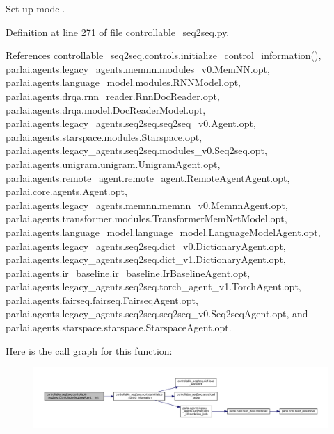 \begin{DoxyVerb}Set up model.\end{DoxyVerb}
 

Definition at line 271 of file controllable\+\_\+seq2seq.\+py.



References controllable\+\_\+seq2seq.\+controls.\+initialize\+\_\+control\+\_\+information(), parlai.\+agents.\+legacy\+\_\+agents.\+memnn.\+modules\+\_\+v0.\+Mem\+N\+N.\+opt, parlai.\+agents.\+language\+\_\+model.\+modules.\+R\+N\+N\+Model.\+opt, parlai.\+agents.\+drqa.\+rnn\+\_\+reader.\+Rnn\+Doc\+Reader.\+opt, parlai.\+agents.\+drqa.\+model.\+Doc\+Reader\+Model.\+opt, parlai.\+agents.\+legacy\+\_\+agents.\+seq2seq.\+seq2seq\+\_\+v0.\+Agent.\+opt, parlai.\+agents.\+starspace.\+modules.\+Starspace.\+opt, parlai.\+agents.\+legacy\+\_\+agents.\+seq2seq.\+modules\+\_\+v0.\+Seq2seq.\+opt, parlai.\+agents.\+unigram.\+unigram.\+Unigram\+Agent.\+opt, parlai.\+agents.\+remote\+\_\+agent.\+remote\+\_\+agent.\+Remote\+Agent\+Agent.\+opt, parlai.\+core.\+agents.\+Agent.\+opt, parlai.\+agents.\+legacy\+\_\+agents.\+memnn.\+memnn\+\_\+v0.\+Memnn\+Agent.\+opt, parlai.\+agents.\+transformer.\+modules.\+Transformer\+Mem\+Net\+Model.\+opt, parlai.\+agents.\+language\+\_\+model.\+language\+\_\+model.\+Language\+Model\+Agent.\+opt, parlai.\+agents.\+legacy\+\_\+agents.\+seq2seq.\+dict\+\_\+v0.\+Dictionary\+Agent.\+opt, parlai.\+agents.\+legacy\+\_\+agents.\+seq2seq.\+dict\+\_\+v1.\+Dictionary\+Agent.\+opt, parlai.\+agents.\+ir\+\_\+baseline.\+ir\+\_\+baseline.\+Ir\+Baseline\+Agent.\+opt, parlai.\+agents.\+legacy\+\_\+agents.\+seq2seq.\+torch\+\_\+agent\+\_\+v1.\+Torch\+Agent.\+opt, parlai.\+agents.\+fairseq.\+fairseq.\+Fairseq\+Agent.\+opt, parlai.\+agents.\+legacy\+\_\+agents.\+seq2seq.\+seq2seq\+\_\+v0.\+Seq2seq\+Agent.\+opt, and parlai.\+agents.\+starspace.\+starspace.\+Starspace\+Agent.\+opt.

Here is the call graph for this function\+:
\nopagebreak
\begin{figure}[H]
\begin{center}
\leavevmode
\includegraphics[width=350pt]{classcontrollable__seq2seq_1_1controllable__seq2seq_1_1ControllableSeq2seqAgent_a2cbe8ed3b2b6b82be90db6b45331800b_cgraph}
\end{center}
\end{figure}


